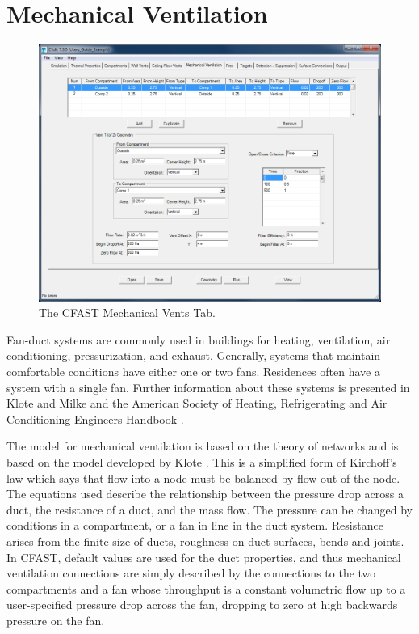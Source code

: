 \section{Mechanical Ventilation}
\begin{figure}[h!]
\begin{center}
\includegraphics[width=6.5in]{FIGURES/Mechanical_Vent_Tab}
\caption[The CFAST Mechanical Vents Tab]{The CFAST Mechanical Vents Tab.}
\end{center}
\end{figure}

Fan-duct systems are commonly used in buildings for heating, ventilation, air conditioning, pressurization, and exhaust. Generally, systems that maintain comfortable conditions have either one or two fans.  Residences often have a system with a single fan. Further information about these systems is presented in  Klote and Milke \cite{Klote:2002} and the American Society of Heating, Refrigerating and Air Conditioning Engineers Handbook \cite{ASHRAE:2001}.

The model for mechanical ventilation is based on the theory of networks and is based on the model developed by Klote \cite{Klote:1988a}.  This is a simplified form of Kirchoff's law which says that flow into a node must be balanced by flow out of the node. The equations used describe the relationship between the pressure drop across a duct, the resistance of a duct, and the mass flow.  The pressure can be changed by conditions in a compartment, or a fan in line in the duct system.  Resistance arises from the finite size of ducts, roughness on duct surfaces, bends and joints. In CFAST, default values are used for the duct properties, and thus mechanical ventilation connections are simply described by the connections to the two compartments and a fan whose throughput is a constant volumetric flow up to a user-specified pressure drop across the fan, dropping to zero at high backwards pressure on the fan.

